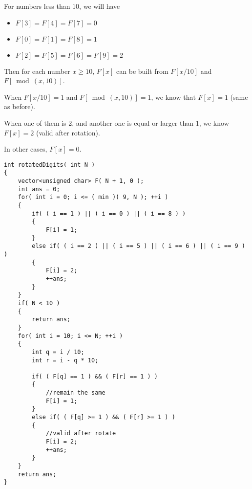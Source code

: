 For numbers less than 10, we will have 

\begin{itemize}
\item $F[3]=F[4]=F[7]=0$
\item $F[0]=F[1]=F[8]=1$
\item $F[2]=F[5]=F[6]=F[9]=2$
\end{itemize}

Then for each number $x\geq 10$, $F[x]$ can be built from $F[x/10]$ and $F[\bmod(x,10)]$.

When $F[x/10]=1$ and $F[\bmod(x, 10)]=1$, we know that $F[x]=1$ (same as before).

When  one of them is 2, and another one is equal or larger than 1, we know $F[x]=2$ (valid after rotation). 

In other cases, $F[x]=0$.

\setcounter{lstlisting}{0}
\begin{lstlisting}[style=customc, caption={DP}]
int rotatedDigits( int N )
{
    vector<unsigned char> F( N + 1, 0 );
    int ans = 0;
    for( int i = 0; i <= ( min )( 9, N ); ++i )
    {
        if( ( i == 1 ) || ( i == 0 ) || ( i == 8 ) )
        {
            F[i] = 1;
        }
        else if( ( i == 2 ) || ( i == 5 ) || ( i == 6 ) || ( i == 9 ) )
        {
            F[i] = 2;
            ++ans;
        }
    }
    if( N < 10 )
    {
        return ans;
    }
    for( int i = 10; i <= N; ++i )
    {
        int q = i / 10;
        int r = i - q * 10;

        if( ( F[q] == 1 ) && ( F[r] == 1 ) )
        {
            //remain the same
            F[i] = 1;
        }
        else if( ( F[q] >= 1 ) && ( F[r] >= 1 ) )
        {
            //valid after rotate
            F[i] = 2;
            ++ans;
        }
    }
    return ans;
}
\end{lstlisting}